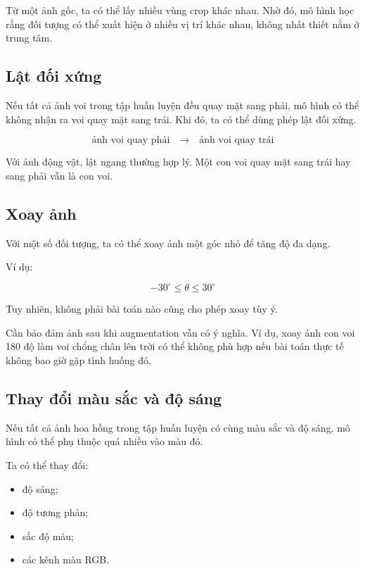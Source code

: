 \begin{vidu}
Từ một ảnh gốc, ta có thể lấy nhiều vùng crop khác nhau. Nhờ đó, mô hình học rằng đối tượng có thể xuất hiện ở nhiều vị trí khác nhau, không nhất thiết nằm ở trung tâm.
\end{vidu}

\subsection{Lật đối xứng}

Nếu tất cả ảnh voi trong tập huấn luyện đều quay mặt sang phải, mô hình có thể không nhận ra voi quay mặt sang trái. Khi đó, ta có thể dùng phép lật đối xứng.

\[
    \text{ảnh voi quay phải}
    \quad \rightarrow \quad
    \text{ảnh voi quay trái}
\]

\begin{vidu}
Với ảnh động vật, lật ngang thường hợp lý. Một con voi quay mặt sang trái hay sang phải vẫn là con voi.
\end{vidu}

\subsection{Xoay ảnh}

Với một số đối tượng, ta có thể xoay ảnh một góc nhỏ để tăng độ đa dạng.

Ví dụ:

\[
    -30^\circ \leq \theta \leq 30^\circ
\]

Tuy nhiên, không phải bài toán nào cũng cho phép xoay tùy ý.

\begin{luuy}
Cần bảo đảm ảnh sau khi augmentation vẫn có ý nghĩa. Ví dụ, xoay ảnh con voi 180 độ làm voi chổng chân lên trời có thể không phù hợp nếu bài toán thực tế không bao giờ gặp tình huống đó.
\end{luuy}

\subsection{Thay đổi màu sắc và độ sáng}

Nếu tất cả ảnh hoa hồng trong tập huấn luyện có cùng màu sắc và độ sáng, mô hình có thể phụ thuộc quá nhiều vào màu đó.

Ta có thể thay đổi:

\begin{itemize}
    \item độ sáng;
    \item độ tương phản;
    \item sắc độ màu;
    \item các kênh màu RGB.
\end{itemize}

